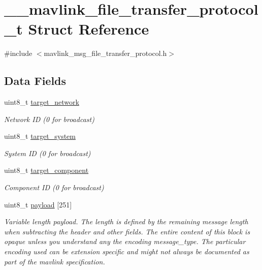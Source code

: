 \hypertarget{struct____mavlink__file__transfer__protocol__t}{\section{\+\_\+\+\_\+mavlink\+\_\+file\+\_\+transfer\+\_\+protocol\+\_\+t Struct Reference}
\label{struct____mavlink__file__transfer__protocol__t}
}


{\ttfamily \#include $<$mavlink\+\_\+msg\+\_\+file\+\_\+transfer\+\_\+protocol.\+h$>$}

\subsection*{Data Fields}
\begin{DoxyCompactItemize}
\item 
uint8\+\_\+t \hyperlink{struct____mavlink__file__transfer__protocol__t_a183206976ca740c583a75d27187930c3}{target\+\_\+network}
\begin{DoxyCompactList}\small\item\em Network I\+D (0 for broadcast) \end{DoxyCompactList}\item 
uint8\+\_\+t \hyperlink{struct____mavlink__file__transfer__protocol__t_a83dbc333e5c1749cd5ca3920e2c2882c}{target\+\_\+system}
\begin{DoxyCompactList}\small\item\em System I\+D (0 for broadcast) \end{DoxyCompactList}\item 
uint8\+\_\+t \hyperlink{struct____mavlink__file__transfer__protocol__t_a37711d71ad8ac75ca8be599ae78a98fb}{target\+\_\+component}
\begin{DoxyCompactList}\small\item\em Component I\+D (0 for broadcast) \end{DoxyCompactList}\item 
uint8\+\_\+t \hyperlink{struct____mavlink__file__transfer__protocol__t_ae0a8d2582f1b5e77001bf0950b21ae4a}{payload} \mbox{[}251\mbox{]}
\begin{DoxyCompactList}\small\item\em Variable length payload. The length is defined by the remaining message length when subtracting the header and other fields. The entire content of this block is opaque unless you understand any the encoding message\+\_\+type. The particular encoding used can be extension specific and might not always be documented as part of the mavlink specification. \end{DoxyCompactList}\end{DoxyCompactItemize}



